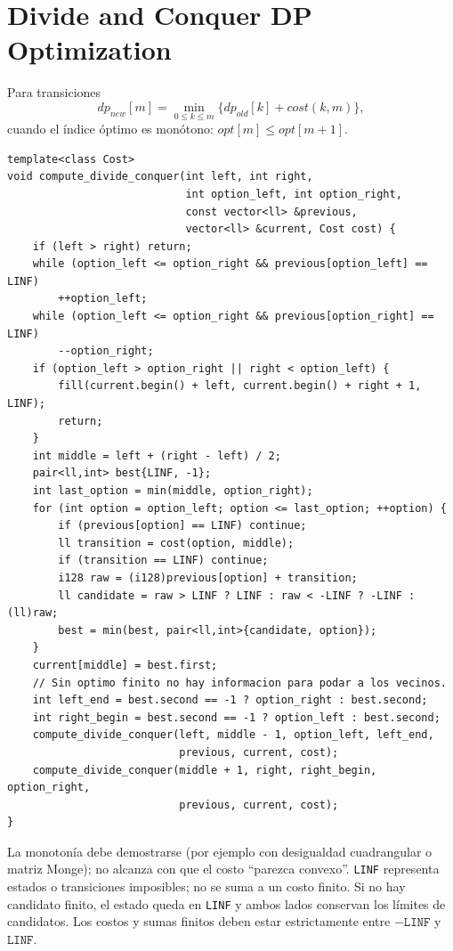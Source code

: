 \section{Divide and Conquer DP Optimization}

Para transiciones
\[
dp_{new}[m]=\min_{0\le k\le m}\{dp_{old}[k]+cost(k,m)\},
\]
cuando el \'indice \'optimo es mon\'otono: $opt[m]\le opt[m+1]$.

\begin{lstlisting}[style=cpp]
template<class Cost>
void compute_divide_conquer(int left, int right,
                            int option_left, int option_right,
                            const vector<ll> &previous,
                            vector<ll> &current, Cost cost) {
    if (left > right) return;
    while (option_left <= option_right && previous[option_left] == LINF)
        ++option_left;
    while (option_left <= option_right && previous[option_right] == LINF)
        --option_right;
    if (option_left > option_right || right < option_left) {
        fill(current.begin() + left, current.begin() + right + 1, LINF);
        return;
    }
    int middle = left + (right - left) / 2;
    pair<ll,int> best{LINF, -1};
    int last_option = min(middle, option_right);
    for (int option = option_left; option <= last_option; ++option) {
        if (previous[option] == LINF) continue;
        ll transition = cost(option, middle);
        if (transition == LINF) continue;
        i128 raw = (i128)previous[option] + transition;
        ll candidate = raw > LINF ? LINF : raw < -LINF ? -LINF : (ll)raw;
        best = min(best, pair<ll,int>{candidate, option});
    }
    current[middle] = best.first;
    // Sin optimo finito no hay informacion para podar a los vecinos.
    int left_end = best.second == -1 ? option_right : best.second;
    int right_begin = best.second == -1 ? option_left : best.second;
    compute_divide_conquer(left, middle - 1, option_left, left_end,
                           previous, current, cost);
    compute_divide_conquer(middle + 1, right, right_begin, option_right,
                           previous, current, cost);
}
\end{lstlisting}

La monoton\'ia debe demostrarse (por ejemplo con desigualdad cuadrangular o
matriz Monge); no alcanza con que el costo ``parezca convexo''.
\texttt{LINF} representa estados o transiciones imposibles; no se suma a un
costo finito. Si no hay candidato finito, el estado queda en \texttt{LINF} y
ambos lados conservan los l\'imites de candidatos. Los costos y sumas finitos
deben estar estrictamente entre $-\texttt{LINF}$ y $\texttt{LINF}$.

